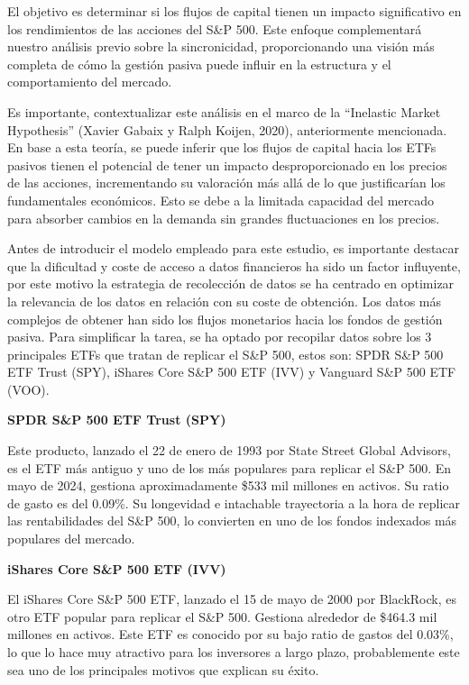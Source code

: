 \documentclass[12pt,a4paper]{article}
\begin{document}
El objetivo es determinar si los flujos de capital tienen un impacto significativo en los rendimientos de las acciones del S\&P 500. Este enfoque complementará nuestro análisis previo sobre la sincronicidad, proporcionando una visión más completa de cómo la gestión pasiva puede influir en la estructura y el comportamiento del mercado.

Es importante, contextualizar este análisis en el marco de la ``Inelastic Market Hypothesis'' (Xavier Gabaix y Ralph Koijen, 2020), anteriormente mencionada. En base a esta teoría, se puede inferir que los flujos de capital hacia los ETFs pasivos tienen el potencial de tener un impacto desproporcionado en los precios de las acciones, incrementando su valoración más allá de lo que justificarían los fundamentales económicos. Esto se debe a la limitada capacidad del mercado para absorber cambios en la demanda sin grandes fluctuaciones en los precios.

Antes de introducir el modelo empleado para este estudio, es importante destacar que la dificultad y coste de acceso a datos financieros ha sido un factor influyente, por este motivo la estrategia de recolección de datos se ha centrado en optimizar la relevancia de los datos en relación con su coste de obtención. Los datos más complejos de obtener han sido los flujos monetarios hacia los fondos de gestión pasiva. Para simplificar la tarea, se ha optado por recopilar datos sobre los 3 principales ETFs que tratan de replicar el S\&P 500, estos son: SPDR S\&P 500 ETF Trust (SPY), iShares Core S\&P 500 ETF (IVV) y Vanguard S\&P 500 ETF (VOO).

\textbf{SPDR S\&P 500 ETF Trust (SPY)}

Este producto, lanzado el 22 de enero de 1993 por State Street Global Advisors, es el ETF más antiguo y uno de los más populares para replicar el S\&P 500. En mayo de 2024, gestiona aproximadamente \$533 mil millones en activos. Su ratio de gasto es del 0.09\%. Su longevidad e intachable trayectoria a la hora de replicar las rentabilidades del S\&P 500, lo convierten en uno de los fondos indexados más populares del mercado.

\textbf{iShares Core S\&P 500 ETF (IVV)}

El iShares Core S\&P 500 ETF, lanzado el 15 de mayo de 2000 por BlackRock, es otro ETF popular para replicar el S\&P 500. Gestiona alrededor de \$464.3 mil millones en activos. Este ETF es conocido por su bajo ratio de gastos del 0.03\%, lo que lo hace muy atractivo para los inversores a largo plazo, probablemente este sea uno de los principales motivos que explican su éxito.
\end{document}
